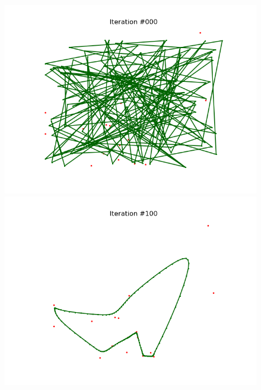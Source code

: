 \documentclass[DIV=12, ngerman, fontsize=12pt, parskip=half]{scrreprt}
\begin{document}
	\begin{figure}[H]
		\begin{center}
			\begin{minipage}[t]{0.45\textwidth}
				\includegraphics[width=\textwidth]{TSP_0}
			\end{minipage}
			\begin{minipage}[t]{0.45\textwidth}
				\includegraphics[width=\textwidth]{TSP_100}
			\end{minipage}
			\begin{minipage}[b]{0.45\textwidth}

\end{minipage}
\end{center}
\end{figure}
\end{document}
